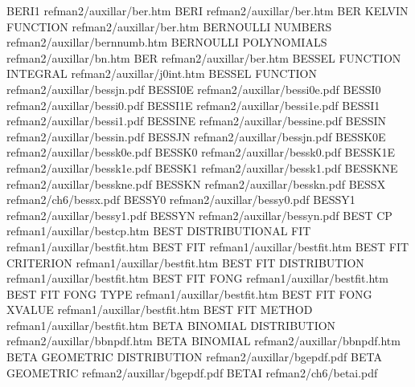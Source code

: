 BERI1                                   refman2/auxillar/ber.htm
BERI                                    refman2/auxillar/ber.htm
BER KELVIN FUNCTION                     refman2/auxillar/ber.htm
BERNOULLI NUMBERS                       refman2/auxillar/bernnumb.htm
BERNOULLI POLYNOMIALS                   refman2/auxillar/bn.htm
BER                                     refman2/auxillar/ber.htm
BESSEL FUNCTION INTEGRAL                refman2/auxillar/j0int.htm
BESSEL FUNCTION                         refman2/auxillar/bessjn.pdf
BESSI0E                                 refman2/auxillar/bessi0e.pdf
BESSI0                                  refman2/auxillar/bessi0.pdf
BESSI1E                                 refman2/auxillar/bessi1e.pdf
BESSI1                                  refman2/auxillar/bessi1.pdf
BESSINE                                 refman2/auxillar/bessine.pdf
BESSIN                                  refman2/auxillar/bessin.pdf
BESSJN                                  refman2/auxillar/bessjn.pdf
BESSK0E                                 refman2/auxillar/bessk0e.pdf
BESSK0                                  refman2/auxillar/bessk0.pdf
BESSK1E                                 refman2/auxillar/bessk1e.pdf
BESSK1                                  refman2/auxillar/bessk1.pdf
BESSKNE                                 refman2/auxillar/besskne.pdf
BESSKN                                  refman2/auxillar/besskn.pdf
BESSX                                   refman2/ch6/bessx.pdf
BESSY0                                  refman2/auxillar/bessy0.pdf
BESSY1                                  refman2/auxillar/bessy1.pdf
BESSYN                                  refman2/auxillar/bessyn.pdf
BEST CP                                 refman1/auxillar/bestcp.htm
BEST DISTRIBUTIONAL FIT                 refman1/auxillar/bestfit.htm
BEST FIT                                refman1/auxillar/bestfit.htm
BEST FIT CRITERION                      refman1/auxillar/bestfit.htm
BEST FIT DISTRIBUTION                   refman1/auxillar/bestfit.htm
BEST FIT FONG                           refman1/auxillar/bestfit.htm
BEST FIT FONG TYPE                      refman1/auxillar/bestfit.htm
BEST FIT FONG XVALUE                    refman1/auxillar/bestfit.htm
BEST FIT METHOD                         refman1/auxillar/bestfit.htm
BETA BINOMIAL DISTRIBUTION              refman2/auxillar/bbnpdf.htm
BETA BINOMIAL                           refman2/auxillar/bbnpdf.htm
BETA GEOMETRIC DISTRIBUTION             refman2/auxillar/bgepdf.pdf
BETA GEOMETRIC                          refman2/auxillar/bgepdf.pdf
BETAI                                   refman2/ch6/betai.pdf

